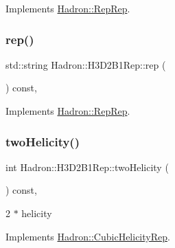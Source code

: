 Implements \mbox{\hyperlink{structHadron_1_1RepRep_ab3213025f6de249f7095892109575fde}{Hadron\+::\+Rep\+Rep}}.

\mbox{\label{structHadron_1_1H3D2B1Rep_a43cf9c155f37ec6e0fa26166cd1a5f2a}} 
\subsubsection{\texorpdfstring{rep()}{rep()}\hspace{0.1cm}{\footnotesize\ttfamily [5/5]}}
{\footnotesize\ttfamily std\+::string Hadron\+::\+H3\+D2\+B1\+Rep\+::rep (\begin{DoxyParamCaption}{ }\end{DoxyParamCaption}) const\hspace{0.3cm}{\ttfamily [inline]}, {\ttfamily [virtual]}}



Implements \mbox{\hyperlink{structHadron_1_1RepRep_ab3213025f6de249f7095892109575fde}{Hadron\+::\+Rep\+Rep}}.

\mbox{\label{structHadron_1_1H3D2B1Rep_aac44e59a958d39120aa886dafe262b7d}} 
\subsubsection{\texorpdfstring{twoHelicity()}{twoHelicity()}\hspace{0.1cm}{\footnotesize\ttfamily [1/3]}}
{\footnotesize\ttfamily int Hadron\+::\+H3\+D2\+B1\+Rep\+::two\+Helicity (\begin{DoxyParamCaption}{ }\end{DoxyParamCaption}) const\hspace{0.3cm}{\ttfamily [inline]}, {\ttfamily [virtual]}}

2 $\ast$ helicity 

Implements \mbox{\hyperlink{structHadron_1_1CubicHelicityRep_af507aa56fc2747eacc8cb6c96db31ecc}{Hadron\+::\+Cubic\+Helicity\+Rep}}.

\mbox{\label{structHadron_1_1H3D2B1Rep_aac44e59a958d39120aa886dafe262b7d}} 
